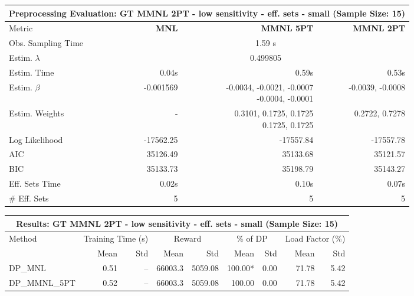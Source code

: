 
\begin{samepage}
\begin{center}
  \small
  \begin{tabular}{l|r|r|r}
    \toprule
    \multicolumn{4}{c}{\textbf{Preprocessing Evaluation: GT MMNL 2PT - low sensitivity - eff. sets - small (Sample Size: 15)}} \\
    \midrule
    Metric & \textbf{MNL} & \textbf{MMNL 5PT} & \textbf{MMNL 2PT} \\
    \midrule
    Obs. Sampling Time & \multicolumn{3}{c}{1.59 s} \\
    Estim. $\lambda$ & \multicolumn{3}{c}{0.499805} \\
    Estim. Time & 0.04s & 0.59s & 0.53s \\
    Estim. $\beta$ & -0.001569 & \makecell[tr]{-0.0034, -0.0021, -0.0007 \\ -0.0004, -0.0001} & -0.0039, -0.0008 \\
    Estim. Weights & - & \makecell[tr]{0.3101, 0.1725, 0.1725 \\ 0.1725, 0.1725} & 0.2722, 0.7278 \\
    Log Likelihood & -17562.25 & -17557.84 & -17557.78 \\
    AIC & 35126.49 & 35133.68 & 35121.57 \\
    BIC & 35133.73 & 35198.79 & 35143.27 \\
    Eff. Sets Time & 0.02s & 0.10s & 0.07s \\
    \# Eff. Sets & 5 & 5 & 5 \\
    \bottomrule
  \end{tabular}
\end{center}
\begin{center}
  \small
  \begin{tabular}{l|rr|rr|rr|rr}
    \toprule
    \multicolumn{9}{c}{\textbf{Results: GT MMNL 2PT - low sensitivity - eff. sets - small (Sample Size: 15)}} \\
    \midrule
    Method & \multicolumn{2}{c|}{Training Time (s)} & \multicolumn{2}{c|}{Reward} & \multicolumn{2}{c|}{\% of DP} & \multicolumn{2}{c}{Load Factor (\%)} \\
    & Mean & Std & Mean & Std & Mean & Std & Mean & Std \\
    \midrule
    DP\_MNL      &     0.51 &    -- &    66003.3 &    5059.08 & 100.00* &    0.00 &   71.78 &    5.42 \\
    DP\_MMNL\_5PT &     0.52 &    -- &    66003.3 &    5059.08 &  100.00 &    0.00 &   71.78 &    5.42 \\

\end{tabular}
\end{center}
\end{samepage}
